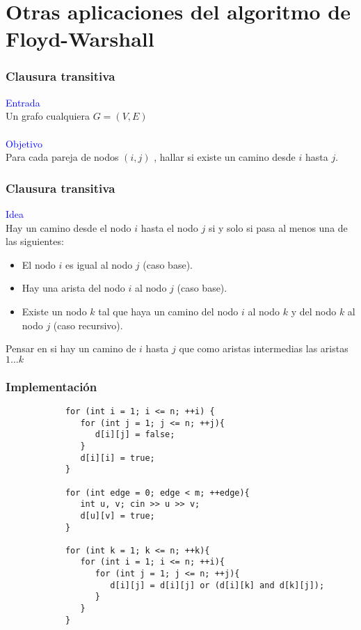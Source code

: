 \documentclass{beamer}
\begin{document}
\section[Aplicaciones]{Otras aplicaciones del algoritmo de Floyd-Warshall}
	\begin{frame}
		\frametitle{Clausura transitiva}
		\textcolor{blue}{\large Entrada}\\
		Un grafo cualquiera $G = (V, E)$ \\ \quad \\
		\textcolor{blue}{\large Objetivo}\\
		Para cada pareja de nodos $(i, j)$ , hallar si existe un camino desde $i$ hasta $j$.
	\end{frame}
	
	\begin{frame}
		\frametitle{Clausura transitiva}
		\textcolor{blue}{\large Idea}\\
		Hay un camino desde el nodo $i$ hasta el nodo $j$ si y solo si pasa al menos una de las siguientes:
		\begin{itemize}
			\item El nodo $i$ es igual al nodo $j$ (caso base).
			\item Hay una arista del nodo $i$ al nodo $j$ (caso base).
			\item Existe un nodo $k$ tal que haya un camino del nodo $i$ al nodo $k$ y del nodo $k$ al nodo $j$ (caso recursivo).
		\end{itemize}
		\vfill
		{\Large Pensar en si hay un camino de $i$ hasta $j$ que como aristas intermedias las aristas $1 \ldots k$}
	\end{frame}
	
	\begin{frame}[fragile]
		\frametitle{Implementación}
		\begin{lstlisting}
			for (int i = 1; i <= n; ++i) {
			   for (int j = 1; j <= n; ++j){
			      d[i][j] = false;
			   }
			   d[i][i] = true;
			}

			for (int edge = 0; edge < m; ++edge){
			   int u, v; cin >> u >> v;
			   d[u][v] = true;
			}
			
			for (int k = 1; k <= n; ++k){
			   for (int i = 1; i <= n; ++i){
			      for (int j = 1; j <= n; ++j){
			         d[i][j] = d[i][j] or (d[i][k] and d[k][j]);
			      }
			   }
			}
		\end{lstlisting}
	\end{frame}
	
\end{document}
